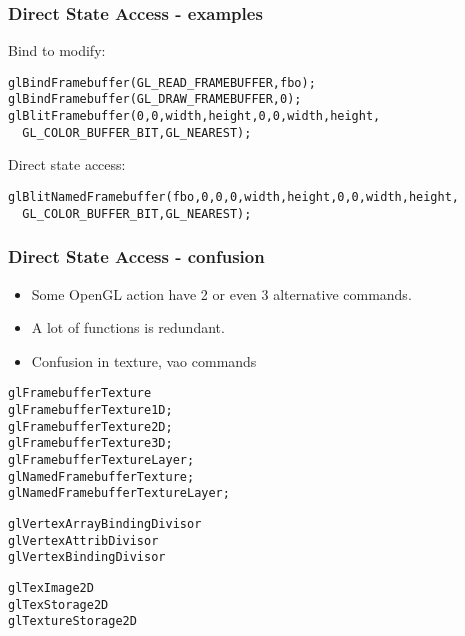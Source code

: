 \begin{frame}[fragile]
  \frametitle{Direct State Access - examples}
    Bind to modify:
    {\scriptsize
    \begin{verbatim}
glBindFramebuffer(GL_READ_FRAMEBUFFER,fbo);
glBindFramebuffer(GL_DRAW_FRAMEBUFFER,0);
glBlitFramebuffer(0,0,width,height,0,0,width,height,
  GL_COLOR_BUFFER_BIT,GL_NEAREST);
    \end{verbatim}
    }
    Direct state access:
    {\scriptsize
    \begin{verbatim}
glBlitNamedFramebuffer(fbo,0,0,0,width,height,0,0,width,height,
  GL_COLOR_BUFFER_BIT,GL_NEAREST);
    \end{verbatim}
    }
\end{frame}

\begin{frame}[fragile]
  \frametitle{Direct State Access - confusion}
  \begin{itemize}
    \item Some OpenGL action have 2 or even 3 alternative commands.
    \item A lot of functions is redundant.
    \item Confusion in texture, vao commands
  \end{itemize}
    {\tiny
    \begin{verbatim}
glFramebufferTexture
glFramebufferTexture1D;
glFramebufferTexture2D;
glFramebufferTexture3D;
glFramebufferTextureLayer;
glNamedFramebufferTexture;
glNamedFramebufferTextureLayer;
    \end{verbatim}
    }
    {\tiny
    \begin{verbatim}
glVertexArrayBindingDivisor
glVertexAttribDivisor
glVertexBindingDivisor
    \end{verbatim}
    }
    {\tiny
    \begin{verbatim}
glTexImage2D
glTexStorage2D
glTextureStorage2D
    \end{verbatim}
    }
\end{frame}

